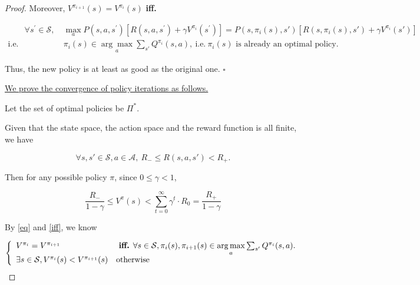 \documentclass{article}
\newcommand{\whiteqed}{\hfill $\square$\par}
\begin{document}
\begin{proof}
    \hspace{1.3em}
    Moreover, $V^{\pi_{i+1}}(s)=V^{\pi_i}(s)$ \textbf{iff.} 

    \vspace{-2.5em}
    \begin{equation}
        \begin{split}
        \qquad \forall s^\prime\in\mathcal{S},
        \ &\underset{a}{\max} P(s,a,s^\prime)\left[R(s,a,s^\prime)+\gamma V^{\pi_i}(s^\prime)\right] = P\left(s,\pi_i(s),s'\right) \left[ R\left(s,\pi_i(s),s'\right) + \gamma V^{\pi_i}(s')\right] \\
        \text{i.e.}\ & \pi_i(s)\in \underset{a}{\arg\max} \sum_{s'} Q^{\pi_i}(s,a),\ \text{i.e.}\ \pi_i(s)\text{ is already an optimal policy.}
        \end{split}
        \label{iff}
    \end{equation}
    

    \hspace{1.3em}
    Thus, the new policy is at least as good as the original one. \whiteqed

    \vspace{1em} \hspace{1.3em}
    \underline{We prove the convergence of policy iterations as follows.} 

    \hspace{1.3em}
    Let the set of optimal policies be $\Pi^*$.

    \hspace{1.3em}
    Given that the state space, the action space and the reward function is all finite, we have

    \vspace{-1.5em}
    $$\forall s,s'\in\mathcal{S}, a\in\mathcal{A},\ R_{-}\le R(s,a,s')<R_+.$$

    \vspace{-0.5em} \hspace{1.3em}
    Then for any possible policy $\pi$, since $0\le\gamma<1$,

    \vspace{-1em}
    $$\frac{R_{-}}{1-\gamma}\le V^{\pi}(s)<\sum_{t=0}^{\infty} \gamma^t\cdot R_0 = \frac{R_+}{1-\gamma}$$
    
    \vspace{-0.5em} \hspace{1.3em}
    By \ref{eq} and \ref{iff}, we know 

    \vspace{-0.5em}
    $$
    \left\{
        \begin{array}{ll}
            V^{\pi_i}=V^{\pi_{i+1}} & \text{ \textbf{iff.} }\forall s\in\mathcal{S}, \pi_i(s),\pi_{i+1}(s)\in \underset{a}{\arg\max} \sum_{s'} Q^{\pi_i}(s,a). \\
            \exists s\in\mathcal{S}, V^{\pi_i}(s)<V^{\pi_{i+1}}(s) & \text{otherwise} 
        \end{array}
    \right.
    $$


\end{proof}
\end{document}
